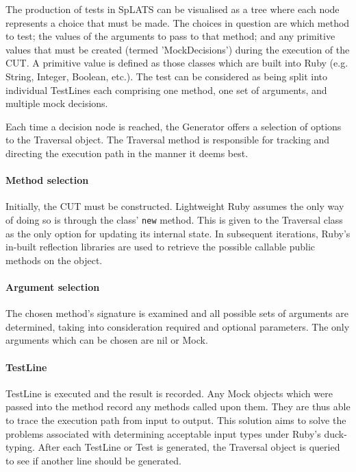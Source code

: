     The production of tests in SpLATS can be visualised as a tree where each
node represents a choice that must be made. The choices in question are which
method to test; the values of the arguments to pass to that method; and any primitive
values that must be created (termed 'MockDecisions') during the execution of the CUT. A primitive value is defined as those classes which are built into Ruby (e.g. String, Integer, Boolean, etc.).
    The test can be considered as being split into individual TestLines each comprising one
method, one set of arguments, and multiple mock decisions.


    Each time a decision node is reached, the Generator offers a selection of options to the Traversal object. The Traversal method is responsible for tracking and directing the execution path in the manner it deems best.
    
    \paragraph{Method selection} Initially, the CUT must be constructed. Lightweight Ruby assumes the only way of doing so is through the class' \texttt{new} method. This is given to the Traversal class as the only option for updating its internal state. In subsequent iterations, Ruby's in-built reflection libraries are used to retrieve the possible callable public methods on the object.
    
    \paragraph{Argument selection} The chosen method's signature is examined and all possible sets of arguments are determined, taking into consideration required and optional parameters. The only arguments which can be chosen are nil or Mock.
    
    \paragraph{TestLine} TestLine is executed and the result is recorded. Any Mock objects which were passed into the method record any methods called upon them. They are thus able to trace the execution path from input to output. This solution aims to solve the problems associated with determining acceptable input types under Ruby's duck-typing. After each TestLine or Test is generated, the Traversal object is queried to see if another line should be generated.
    

